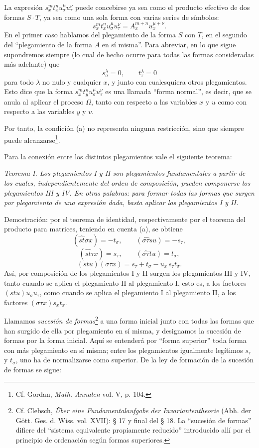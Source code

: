\documentclass[11pt]{article}
\begin{document}
La expresión $s_x^m t_x^n u_\sigma^\mu u_\tau^\nu$ puede concebirse ya sea como el producto efectivo de dos formas $S\cdot T$, ya sea como una sola forma con varias series de símbolos:
\[
s_x^m t_x^n u_\sigma^\mu u_\tau^\nu=A_x^{m+n}u_x^{\mu+\nu}.
\]
En el primer caso hablamos del plegamiento de la forma $S$ con $T$, en el segundo del ``plegamiento de la forma $A$ en sí misma''. Para abreviar, en lo que sigue supondremos siempre (lo cual de hecho ocurre para todas las formas consideradas más adelante) que
\[
\tag{a}
s_\sigma^\lambda=0,\qquad t_\tau^\lambda=0
\]
para todo $\lambda$ no nulo y cualquier $x$, y junto con cualesquiera otros plegamientos. Esto dice que la forma $s_x^m t_y^n u_\sigma^\mu u_\tau^\nu$ es una llamada ``forma normal'', es decir, que se anula al aplicar el proceso $\Omega$, tanto con respecto a las variables $x$ y $u$ como con respecto a las variables $y$ y $v$.

Por tanto, la condición (a) no representa ninguna restricción, sino que siempre puede alcanzarse\footnote{Cf. Gordan, \emph{Math. Annalen} vol. V, p. 104.}.

Para la conexión entre los distintos plegamientos vale el siguiente teorema:

\emph{Teorema I. Los plegamientos I y II son plegamientos fundamentales a partir de los cuales, independientemente del orden de composición, pueden componerse los plegamientos III y IV. En otras palabras: para formar todas las formas que surgen por plegamiento de una expresión dada, basta aplicar los plegamientos I y II.}

Demostración: por el teorema de identidad, respectivamente por el teorema del producto para matrices, teniendo en cuenta (a), se obtiene
\[
(\widehat{st}\sigma x)=-t_\sigma,\qquad
(\widehat{\sigma\tau}su)=-s_\tau,
\]
\[
(\widehat{st}\tau x)=s_\tau,\qquad
(\widehat{\sigma\tau}tu)=t_\sigma,
\]
\[
(stu)(\sigma\tau x)=s_\tau+t_\sigma-u_x\,s_\tau t_\sigma .
\]
Así, por composición de los plegamientos I y II surgen los plegamientos III y IV, tanto cuando se aplica el plegamiento II al plegamiento I, esto es, a los factores $(stu)u_\sigma u_\tau$, como cuando se aplica el plegamiento I al plegamiento II, a los factores $(\sigma\tau x)s_xt_x$.

Llamamos \emph{sucesión de formas}\footnote{Cf. Clebsch, \emph{Über eine Fundamentalaufgabe der Invariantentheorie} (Abh. der Gött. Ges. d. Wiss. vol. XVII): § 17 y final del § 18. La ``sucesión de formas'' difiere del ``sistema equivalente propiamente reducido'' introducido allí por el principio de ordenación según formas superiores.} a una forma inicial junto con todas las formas que han surgido de ella por plegamiento en sí misma, y designamos la sucesión de formas por la forma inicial. Aquí se entenderá por ``forma superior'' toda forma con más plegamiento en sí misma; entre los plegamientos igualmente legítimos $s_\tau$ y $t_\sigma$, uno ha de normalizarse como superior. De la ley de formación de la sucesión de formas se sigue:
\end{document}

